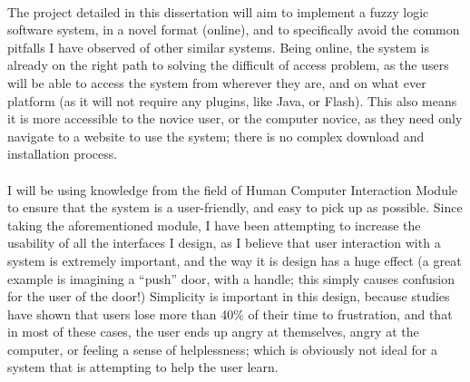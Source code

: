 \ \\
The project detailed in this dissertation will aim to implement a fuzzy logic software system, in a novel format (online), and to specifically avoid the common pitfalls I have observed of other similar systems. Being online, the system is already on the right path to solving the difficult of access problem, as the users will be able to access the system from wherever they are, and on what ever platform (as it will not require any plugins, like Java, or Flash). This also means it is more accessible to the novice user, or the computer novice, as they need only navigate to a website to use the system; there is no complex download and installation process.
\ \\
\ \\
I will be using knowledge from the field of Human Computer Interaction Module to ensure that the system is a user-friendly, and easy to pick up as possible. Since taking the aforementioned module, I have been attempting to increase the usability of all the interfaces I design, as I believe that user interaction with a system is extremely important, and the way it is design has a huge effect (a great example is imagining a ``push'' door, with a handle; this simply causes confusion for the user of the door!) Simplicity is important in this design, because studies have shown that users lose more than 40\% of their time to frustration, and that in most of these cases, the user ends up angry at themselves, angry at the computer, or feeling a sense of helplessness\cite{lazar2006workplace}; which is obviously not ideal for a system that is attempting to help the user learn.
